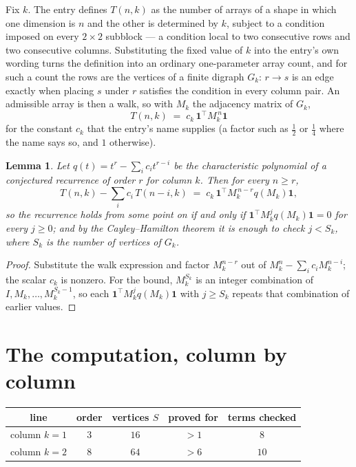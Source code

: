 \documentclass[11pt,a4paper]{article}
\theoremstyle{plain}
\newtheorem{lemma}[theorem]{Lemma}
\theoremstyle{definition}
\begin{document}
Fix $k$. The entry defines $T(n,k)$ as the number of arrays of a shape in which one dimension
is $n$ and the other is determined by $k$, subject to a condition imposed on every
$2\times2$ subblock --- a condition local to two consecutive rows and two consecutive columns.
Substituting the fixed value of $k$ into the entry's own wording turns the definition into an
ordinary one-parameter array count, and for such a count the rows are the vertices of a finite
digraph $G_k$: $r\to s$ is an edge exactly when placing $s$ under $r$ satisfies the condition
in every column pair. An admissible array is then a walk, so with $M_k$ the adjacency matrix
of $G_k$,
\[
T(n,k)\;=\;c_k\,\mathbf{1}^{\!\top}M_k^{\,n}\mathbf{1}
\]
for the constant $c_k$ that the entry's name supplies (a factor such as $\tfrac12$ or
$\tfrac14$ where the name says so, and $1$ otherwise).

\begin{lemma}\label{lem:crit}
Let $q(t)=t^{r}-\sum_i c_it^{r-i}$ be the characteristic polynomial of a conjectured
recurrence of order $r$ for column $k$. Then for every $n\ge r$,
\[
T(n,k)-\sum_i c_i\,T(n-i,k)\;=\;c_k\,\mathbf{1}^{\!\top}M_k^{\,n-r}q(M_k)\mathbf{1},
\]
so the recurrence holds from some point on if and only if
$\mathbf{1}^{\!\top}M_k^{j}q(M_k)\mathbf{1}=0$ for every $j\ge0$; and by the
Cayley--Hamilton theorem it is enough to check $j<S_k$, where $S_k$ is the number of vertices
of $G_k$.
\end{lemma}

\begin{proof}
Substitute the walk expression and factor $M_k^{n-r}$ out of $M_k^{n}-\sum_ic_iM_k^{n-i}$;
the scalar $c_k$ is nonzero. For the bound, $M_k^{S_k}$ is an integer combination of
$I,M_k,\dots,M_k^{S_k-1}$, so each $\mathbf{1}^{\!\top}M_k^{j}q(M_k)\mathbf{1}$ with
$j\ge S_k$ repeats that combination of earlier values.
\end{proof}

\section{The computation, column by column}

\begin{center}
\begin{tabular}{ccccc}
line & order & vertices $S$ & proved for & terms checked \\ \hline
column $k$$=1$ & $3$ & $16$ & $>1$ & $8$ \\
column $k$$=2$ & $8$ & $64$ & $>6$ & $10$ \\
\end{tabular}
\end{center}
\end{document}
